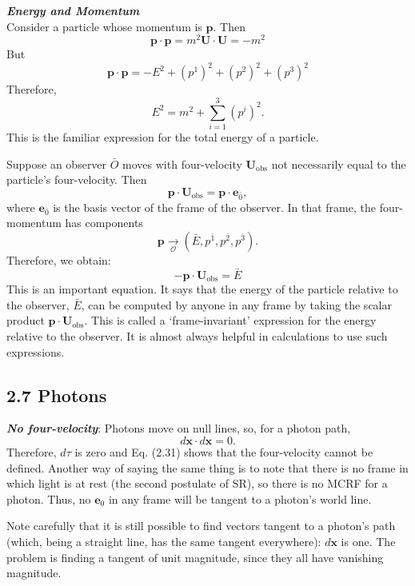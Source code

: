 \documentclass[12pt]{book}
\begin{document}
    \textit{\textbf{Energy and Momentum}}\\
        Consider a particle whose momentum is \( \mathbf{p} \). Then
        \[
        \mathbf{p} \cdot \mathbf{p} = m^2 \mathbf{U} \cdot \mathbf{U} = -m^2
        \]
        But
        \[
        \mathbf{p} \cdot \mathbf{p} = -E^2 + (p^1)^2 + (p^2)^2 + (p^3)^2
        \]
        Therefore,
        \[
        E^2 = m^2 + \sum_{i=1}^{3} (p^i)^2.
        \]
        This is the familiar expression for the total energy of a particle.
        
        Suppose an observer \( \bar{O} \) moves with four-velocity \( \mathbf{U}_{\text{obs}} \) not necessarily equal to the particle’s four-velocity. Then
        \[
        \mathbf{p} \cdot \mathbf{U}_{\text{obs}} = \mathbf{p} \cdot \mathbf{e}_{\bar{0}},
        \]
        where \( \mathbf{e}_{\bar{0}} \) is the basis vector of the frame of the observer. In that frame, the four-momentum has components
        \[
        \mathbf{p} \underset{\mathcal{O}}{\rightarrow} (\bar{E}, p^\bar{1}, p^\bar{2}, p^\bar{3}).
        \]
        Therefore, we obtain:
        \[
        - \mathbf{p} \cdot \mathbf{U}_{\text{obs}} = \bar{E}
        \]
        This is an important equation. It says that the energy of the particle relative to the observer, \( \bar{E} \), can be computed by anyone in any frame by taking the scalar product \( \mathbf{p} \cdot \mathbf{U}_{\text{obs}} \). This is called a ‘frame-invariant’ expression for the energy relative to the observer. It is almost always helpful in calculations to use such expressions.\\

    \subsection{2.7 Photons }

        \textit{\textbf{No four-velocity}}: Photons move on null lines, so, for a photon path,
        \[
        d\mathbf{x} \cdot d\mathbf{x} = 0.
        \]
        Therefore, \( d\tau \) is zero and Eq. (2.31) shows that the four-velocity cannot be defined. Another way of saying the same thing is to note that there is no frame in which light is at rest (the second postulate of SR), so there is no MCRF for a photon. Thus, no \( \mathbf{e}_0 \) in any frame will be tangent to a photon’s world line.
        
        Note carefully that it is still possible to find vectors tangent to a photon’s path (which, being a straight line, has the same tangent everywhere): \( d\mathbf{x} \) is one. The problem is finding a tangent of unit magnitude, since they all have vanishing magnitude.
\end{document}
